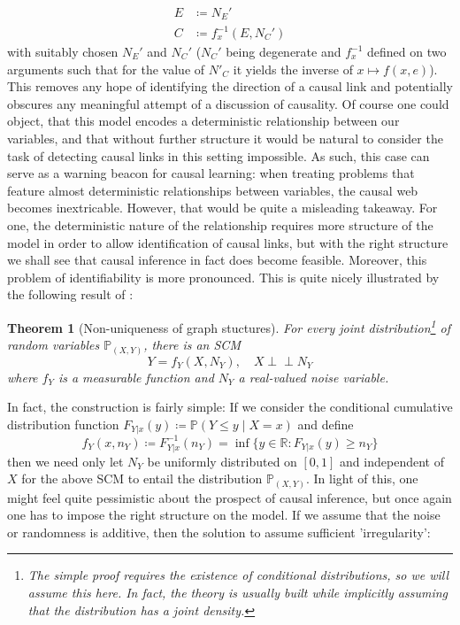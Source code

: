 \documentclass[11pt, a4paper]{memoir}
\theoremstyle{break}
\newtheorem{thm}{Theorem}
\theoremstyle{break}
\theoremstyle{nonumberplain}
\newcommand{\mR}{\mathbb{R}}
\newcommand{\mP}{\mathbb{P}}
\newcommand{\indep}{\perp \!\!\! \perp}
\begin{document}
\begin{align*}
E&\coloneqq N_E'\\
C&\coloneqq f_x^{-1}(E,N_C')
\end{align*}
with suitably chosen $N_E'$ and $N_C'$ ($N_C'$ being degenerate and $f_x^{-1}$ defined on two arguments such that for the value of $N'_C$ it yields the inverse of $x\mapsto f(x,e)$). This removes any hope of identifying the direction of a causal link and potentially obscures any meaningful attempt of a discussion of causality. Of course one could object, that this model encodes a deterministic relationship between our variables, and that without further structure it would be natural to consider the task of detecting causal links in this setting impossible. As such, this case can serve as a warning beacon for causal learning: when treating problems that feature almost deterministic relationships between variables, the causal web becomes inextricable. However, that would be quite a misleading takeaway. For one, the deterministic nature of the relationship requires more structure of the model in order to allow identification of causal links, but with the right structure we shall see that causal inference in fact does become feasible. Moreover, this problem of identifiability is more pronounced. This is quite nicely illustrated by the following result of \cite{Peters}:
\begin{thm}[Non-uniqueness of graph stuctures]
For every joint distribution\footnote{The simple proof requires the existence of conditional distributions, so we will assume this here. In fact, the theory is usually built while implicitly assuming that the distribution has a joint density.} of random variables $\mP_{(X,Y)}$, there is an SCM
$$Y=f_Y(X,N_Y),\quad X\indep N_Y$$
where $f_Y$ is a measurable function and $N_Y$ a real-valued noise variable.
\end{thm}
In fact, the construction is fairly simple: If we consider the conditional cumulative distribution function $F_{Y|x}(y)\coloneqq \mP(Y\leqslant y\mid X=x)$ and define
$$f_Y(x,n_Y)\coloneqq F^{-1}_{Y|x}(n_Y)=\inf\{y\in \mR: F_{Y|x}(y)\geqslant n_Y\}$$
then we need only let $N_Y$ be uniformly distributed on $[0,1]$ and independent of $X$ for the above SCM to entail the distribution $\mP_{(X,Y)}$. In light of this, one might feel quite pessimistic about the prospect of causal inference, but once again one has to impose the right structure on the model. If we assume that the noise or randomness is additive, then the solution  to assume sufficient 'irregularity':
\end{document}
